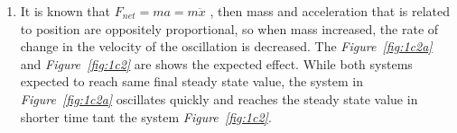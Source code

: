 \documentclass[a4paper,12pt]{article}
\begin{document}
\begin{enumerate}
\begin{enumerate}
\begin{enumerate}
			
			
			
			\item It is known that $F_{net}=ma=m\ddot{x} $ , then mass and acceleration that is related to position are oppositely proportional, so when mass increased, the rate of change in the velocity of the oscillation is decreased. The \textit{Figure~\ref{fig:1c2a}} and \textit{Figure~\ref{fig:1c2}} are shows the expected effect. While both systems expected to reach same final steady state value, the system in \textit{Figure~\ref{fig:1c2a}} oscillates quickly and reaches the steady state value in shorter time tant the system \textit{Figure~\ref{fig:1c2}}.
			

\end{enumerate}
\end{enumerate}
\end{enumerate}
\end{document}
